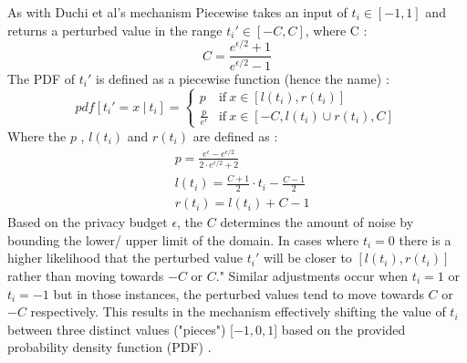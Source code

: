 As with Duchi et al's mechanism Piecewise takes an input of  $t_i \in [-1, 1]$ and returns a perturbed value in the range $t_i' \in [-C, C]$, where C \citep{wang_collecting_2019}:
\begin{equation}
    C = \frac{e^{\epsilon/2} + 1}{e^{\epsilon/2} - 1}
\end{equation}
The PDF of $t_i'$  is defined as a piecewise function (hence the name) \citep{wang_collecting_2019}:
\begin{equation}
    pdf [t_i' = x \ | \ t_i ] = 
    \begin{cases}
        p & \text{if} \ x \in [l(t_i), r(t_i)] \\ 
        \frac{p}{e^\epsilon} & \text{if} \ x \in [-C, l(t_i) \cup r(t_i), C]
    \end{cases}
    \label{eq:piecewise-domain}
\end{equation}
Where the $p$ , $l(t_i)$ and $r(t_i)$ are defined as \citep{wang_collecting_2019}:
\begin{align}
    \label{piecewise-p}
    & p = \frac{e^\epsilon - e^{\epsilon/2}}{2 \cdot e^{\epsilon/2} + 2} \\ 
    \label{piecewise-l-i}
    & l(t_i) = \frac{C + 1}{2} \cdot t_i - \frac{C - 1}{2} \\
    \label{piecewise-r-i}
    & r(t_i) = l(t_i) + C - 1
\end{align}
Based on the privacy budget $\epsilon$, the $C$ determines the amount of noise by bounding the lower/ upper limit of the domain.
In cases where $t_i = 0$ there is a higher likelihood that the perturbed value $t_i'$ will be closer to $[l(t_i), r(t_i)]$ rather than moving towards $-C$ or $C$."
Similar adjustments occur when $t_i = 1$ or $t_i = -1$ but in those instances, the perturbed values tend to move towards $C$ or $-C$ respectively. 
This results in the mechanism effectively shifting the value of $t_i$ between three distinct values ("pieces") [$-1, 0, 1$] based on the provided probability density function (PDF) \citep{wang_collecting_2019}.



